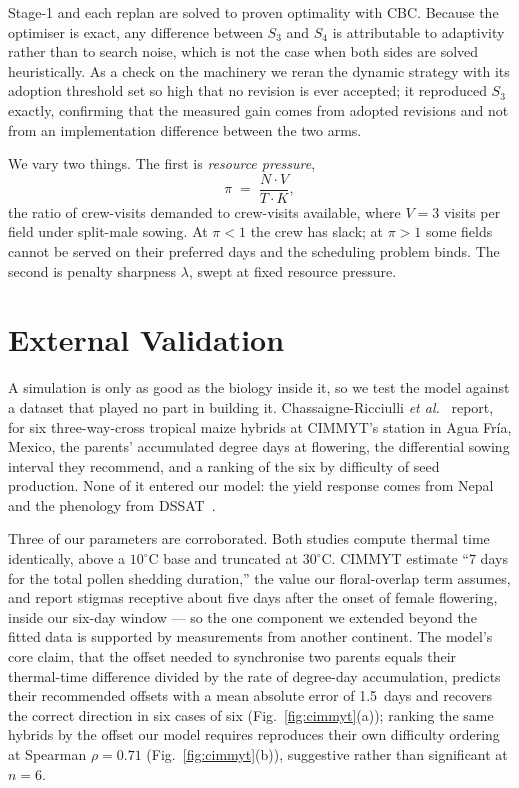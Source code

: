 \documentclass[10pt,twocolumn]{article}
\begin{document}
Stage-1 and each replan are solved to proven optimality with CBC. Because the
optimiser is exact, any difference between $S_3$ and $S_4$ is attributable to
adaptivity rather than to search noise, which is not the case when both sides
are solved heuristically. As a check on the machinery we reran the dynamic
strategy with its adoption threshold set so high that no revision is ever
accepted; it reproduced $S_3$ exactly, confirming that the measured gain comes
from adopted revisions and not from an implementation difference between the
two arms.

We vary two things. The first is \emph{resource pressure},
\[
  \pi \;=\; \frac{N \cdot V}{T \cdot K},
\]
the ratio of crew-visits demanded to crew-visits available, where $V = 3$
visits per field under split-male sowing. At $\pi < 1$ the crew has slack; at
$\pi > 1$ some fields cannot be served on their preferred days and the
scheduling problem binds. The second is penalty sharpness $\lambda$, swept at
fixed resource pressure.

\section{External Validation}
\label{sec:validation}

A simulation is only as good as the biology inside it, so we test the model
against a dataset that played no part in building it.
Chassaigne-Ricciulli \textit{et al.}~\cite{chassaigne2021} report, for six
three-way-cross tropical maize hybrids at CIMMYT's station in Agua Fr\'ia,
Mexico, the parents' accumulated degree days at flowering, the differential
sowing interval they recommend, and a ranking of the six by difficulty of
seed production. None of it entered our model: the yield response comes from
Nepal~\cite{marahatta2025} and the phenology from DSSAT~\cite{dssat}.

Three of our parameters are corroborated. Both studies compute thermal time
identically, above a $10^\circ$C base and truncated at $30^\circ$C. CIMMYT
estimate ``7 days for the total pollen shedding duration,'' the value our
floral-overlap term assumes, and report stigmas receptive about five days
after the onset of female flowering, inside our six-day window --- so the one
component we extended beyond the fitted data is supported by measurements
from another continent. The model's core claim, that the offset needed to
synchronise two parents equals their thermal-time difference divided by the
rate of degree-day accumulation, predicts their recommended offsets with a
mean absolute error of 1.5~days and recovers the correct direction in six
cases of six (Fig.~\ref{fig:cimmyt}(a)); ranking the same hybrids by the
offset our model requires reproduces their own difficulty ordering at
Spearman $\rho = 0.71$ (Fig.~\ref{fig:cimmyt}(b)), suggestive rather than
significant at $n = 6$.
\end{document}
